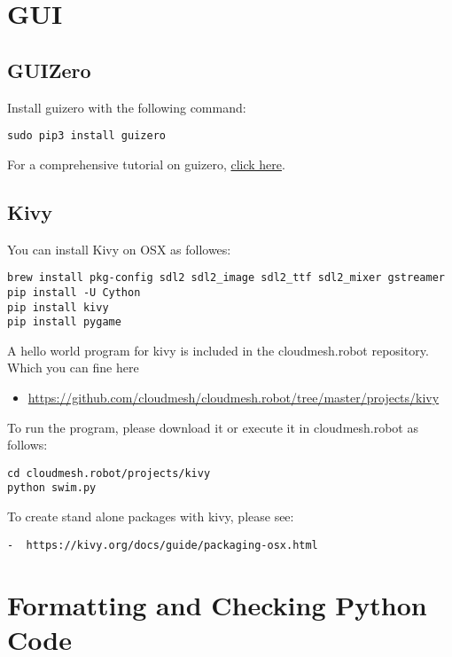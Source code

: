 \section{GUI}\label{gui}

\subsection{GUIZero}\label{guizero}

Install guizero with the following command:

\begin{verbatim}
sudo pip3 install guizero
\end{verbatim}

For a comprehensive tutorial on guizero,
\href{https://lawsie.github.io/guizero/howto/}{click here}.

\subsection{Kivy}\label{kivy}

You can install Kivy on OSX as followes:

\begin{verbatim}
brew install pkg-config sdl2 sdl2_image sdl2_ttf sdl2_mixer gstreamer
pip install -U Cython
pip install kivy
pip install pygame
\end{verbatim}

A hello world program for kivy is included in the cloudmesh.robot
repository. Which you can fine here

\begin{itemize}
\tightlist
\item
  \url{https://github.com/cloudmesh/cloudmesh.robot/tree/master/projects/kivy}
\end{itemize}

To run the program, please download it or execute it in cloudmesh.robot
as follows:

\begin{verbatim}
cd cloudmesh.robot/projects/kivy
python swim.py
\end{verbatim}

To create stand alone packages with kivy, please see:

\begin{verbatim}
-  https://kivy.org/docs/guide/packaging-osx.html
\end{verbatim}

\section{Formatting and Checking Python
Code}\label{formatting-and-checking-python-code}

